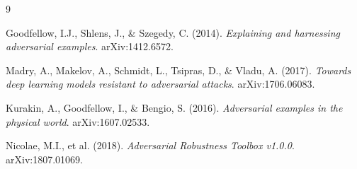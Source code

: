 \documentclass[12pt,a4paper]{article}
\begin{document}
\begin{thebibliography}{9}

Goodfellow, I.J., Shlens, J., \& Szegedy, C. (2014).
\textit{Explaining and harnessing adversarial examples}.
arXiv:1412.6572.

Madry, A., Makelov, A., Schmidt, L., Tsipras, D., \& Vladu, A. (2017).
\textit{Towards deep learning models resistant to adversarial attacks}.
arXiv:1706.06083.

Kurakin, A., Goodfellow, I., \& Bengio, S. (2016).
\textit{Adversarial examples in the physical world}.
arXiv:1607.02533.

Nicolae, M.I., et al. (2018).
\textit{Adversarial Robustness Toolbox v1.0.0}.
arXiv:1807.01069.

\end{thebibliography}
\end{document}
